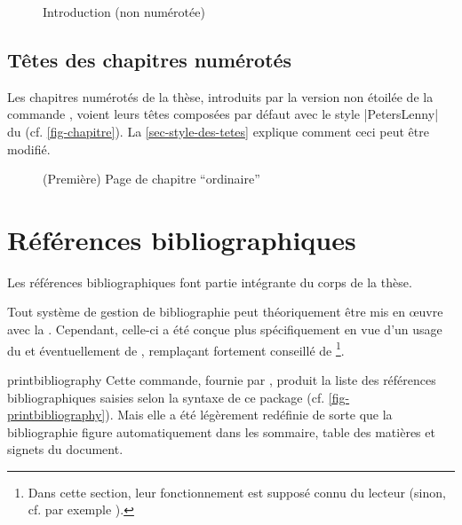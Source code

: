 \begin{figure}[p]
  \centering
  \caption{Introduction (non numérotée)}
  \label{fig-introduction}
\end{figure}

\subsection{Têtes des chapitres numérotés}
\label{sec-chapitres-numerotes}%
%

Les chapitres numérotés de la thèse, introduits par la version non étoilée de la
commande , voient leurs têtes composées par défaut avec
le style |PetersLenny| du  (cf. \vref{fig-chapitre}). La
\vref{sec-style-des-tetes} explique comment ceci peut être modifié.

\begin{figure}[ht]
  \centering
  \caption[Chapitre \enquote{ordinaire}]{(Première) Page de chapitre
    \enquote{ordinaire}}
  \label{fig-chapitre}
\end{figure}

\section{Références bibliographiques}\label{sec-refer-bibl}
%

Les références bibliographiques font partie intégrante du corps de la thèse.

Tout système de gestion de bibliographie peut théoriquement être mis en œuvre
avec la \yatCl. Cependant, celle-ci a été conçue plus spécifiquement en vue
d'un usage du  et éventuellement de ,
remplaçant fortement conseillé de \footnote{Dans cette section,
  leur fonctionnement est supposé connu du lecteur (sinon, cf. par exemple
  \cite{en-ligne6}).}.

\begin{docCommand}[doc description=\mandatory]{printbibliography}{}
  Cette commande, fournie par , produit la liste des
  références bibliographiques saisies selon la syntaxe de ce package (cf.
  \vref{fig-printbibliography}). Mais elle a été légèrement redéfinie de sorte
  que la bibliographie figure automatiquement dans les sommaire, table des
  matières et signets du document.
\end{docCommand}

